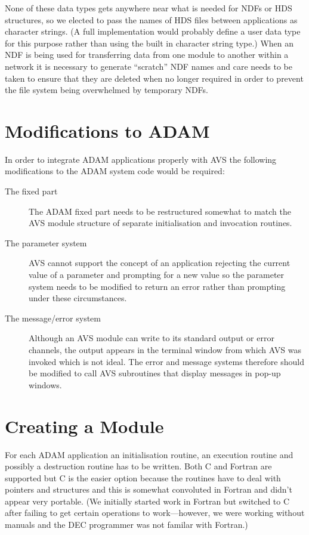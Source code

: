None of these data types gets anywhere near what is needed for NDFs or HDS
structures, so we elected to pass the names of HDS files between applications
as character strings. (A full implementation would probably define a user data
type for this purpose rather than using the built in character string type.)
When an NDF is being used for transferring data from one module to another
within a network it is necessary to generate ``scratch'' NDF names and care
needs to be taken to ensure that they are deleted when no longer required in
order to prevent the file system being overwhelmed by temporary NDFs.

\section{Modifications to ADAM}

In order to integrate ADAM applications properly with AVS the following
modifications to the ADAM system code would be required:
\begin{description}

\item[The fixed part]
The ADAM fixed part needs to be restructured somewhat to match the AVS module
structure of separate initialisation and invocation routines.

\item[The parameter system]
AVS cannot support the concept of an application rejecting the current value of
a parameter and prompting for a new value so the parameter system needs to be
modified to return an error rather than prompting under these circumstances.

\item[The message/error system]
Although an AVS module can write to its standard output or error channels, the
output appears in the terminal window from which AVS was invoked which is not
ideal. The error and message systems therefore should be modified to call 
AVS subroutines that display messages in pop-up windows.

\end{description}

\section{Creating a Module}

For each ADAM application an initialisation routine, an execution routine and
possibly a destruction routine has to be written. Both C and Fortran are
supported but C is the easier option because the routines have to deal with
pointers and structures and this is somewhat convoluted in Fortran and didn't
appear very portable. (We initially started work in Fortran but switched to C
after failing to get certain operations to work---however, we were working
without manuals and the DEC programmer was not familar with Fortran.) 

